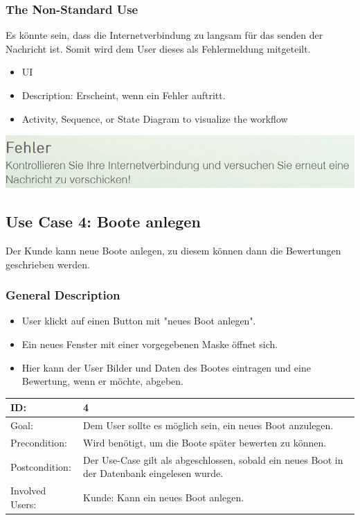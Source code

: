 \documentclass[12pt]{article}
\theoremstyle{definition}
\begin{document}
\subsubsection{The Non-Standard Use}
Es könnte sein, dass die Internetverbindung zu langsam für das senden der Nachricht ist. Somit wird dem User dieses als Fehlermeldung mitgeteilt.
\begin{itemize}
	\item UI
	\item Description: Erscheint, wenn ein Fehler auftritt.
	\item Activity, Sequence, or State Diagram to visualize the workflow
\end{itemize}
\includegraphics[height=0.40\textwidth]{Fehler2.PNG}
\pagebreak


\subsection{Use Case 4: Boote anlegen}
Der Kunde kann neue Boote anlegen, zu diesem können dann die Bewertungen geschrieben werden.
\subsubsection{General Description}
	\begin{itemize}
		\item User klickt auf einen Button mit "neues Boot anlegen".
		\item Ein neues Fenster mit einer vorgegebenen Maske öffnet sich.
		\item Hier kann der User Bilder und Daten des Bootes eintragen und eine Bewertung, wenn er möchte, abgeben.
	\end{itemize}

\begin{tabular}{|p{.2\linewidth}|p{.65\linewidth}|}
\hline 
ID: & 4 \\ \hline
Goal: & Dem User sollte es möglich sein, ein neues Boot anzulegen. \\ \hline
Precondition: & Wird benötigt, um die Boote später bewerten zu können. \\ \hline
Postcondition: & Der Use-Case gilt als abgeschlossen, sobald ein neues Boot in der Datenbank eingelesen wurde.\\ \hline
Involved Users: &Kunde: Kann ein neues Boot anlegen. \\ \hline
\end{tabular}
\end{document}
